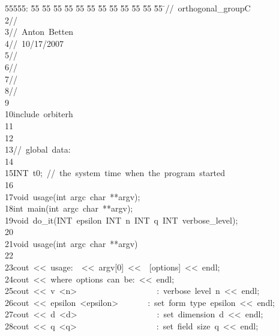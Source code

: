 %
%
\begin{tabbing}
55555: \= 55 \= 55 \= 55 \= 55 \= 55 \= 55 \= 55 \= 55 \= 55 \= 55 \= 55 \= 55 \= \>//\ orthogonal\_groupC\\[0pt]
2\>//\ \\[0pt]
3\>//\ Anton\ Betten\\[0pt]
4\>//\ 10/17/2007\\[0pt]
5\>//\\[0pt]
6\>//\ \\[0pt]
7\>//\\[0pt]
8\>//\\[0pt]
9\>\\[0pt]
10\>include\ orbiterh\\[0pt]
11\>\\[0pt]
12\>\\[0pt]
13\>//\ global\ data:\\[0pt]
14\>\\[0pt]
15\>INT\ t0;\ //\ the\ system\ time\ when\ the\ program\ started\\[0pt]
16\>\\[0pt]
17\>void\ usage(int\ argc\ char\ **argv);\\[0pt]
18\>int\ main(int\ argc\ char\ **argv);\\[0pt]
19\>void\ do\_it(INT\ epsilon\ INT\ n\ INT\ q\ INT\ verbose\_level);\\[0pt]
20\>\\[0pt]
21\>void\ usage(int\ argc\ char\ **argv)\\[0pt]
22\>\\[0pt]
23\>\>cout\ <<\ usage:\ \ <<\ argv[0]\ <<\ \ [options]\ <<\ endl;\\[0pt]
24\>\>cout\ <<\ where\ options\ can\ be:\ <<\ endl;\\[0pt]
25\>\>cout\ <<\ v\ <n>\ \ \ \ \ \ \ \ \ \ \ \ \ \ \ \ \ \ \ :\ verbose\ level\ n\ <<\ endl;\\[0pt]
26\>\>cout\ <<\ epsilon\ <epsilon>\ \ \ \ \ \ \ :\ set\ form\ type\ epsilon\ <<\ endl;\\[0pt]
27\>\>cout\ <<\ d\ <d>\ \ \ \ \ \ \ \ \ \ \ \ \ \ \ \ \ \ \ :\ set\ dimension\ d\ <<\ endl;\\[0pt]
28\>\>cout\ <<\ q\ <q>\ \ \ \ \ \ \ \ \ \ \ \ \ \ \ \ \ \ \ :\ set\ field\ size\ q\ <<\ endl;\\[0pt]

\end{tabbing}
